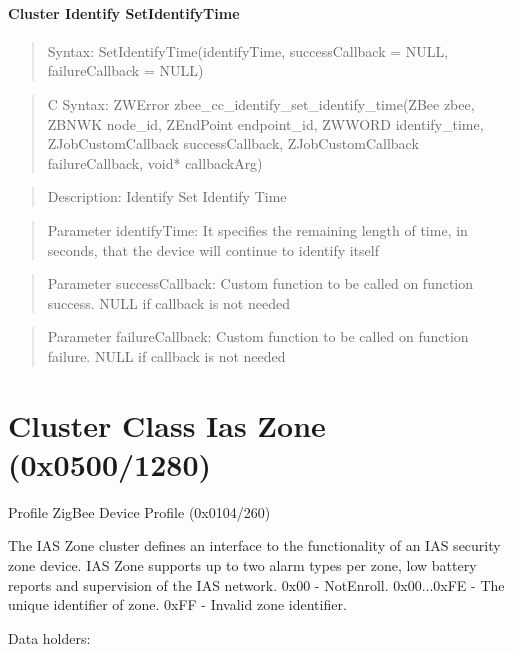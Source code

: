 \paragraph{Cluster Identify SetIdentifyTime}
\begin{quote}Syntax: SetIdentifyTime(identifyTime, successCallback = NULL, failureCallback = NULL)\end{quote}
\begin{quote}C Syntax: ZWError zbee\_cc\_identify\_set\_identify\_time(ZBee zbee, ZBNWK node\_id, ZEndPoint endpoint\_id, ZWWORD identify\_time, ZJobCustomCallback successCallback, ZJobCustomCallback failureCallback, void* callbackArg)\end{quote}
\begin{quote}Description: Identify Set Identify Time\end{quote}
\begin{quote}Parameter identifyTime: It specifies the remaining length of time, in seconds, that the device will continue to identify itself\end{quote}
\begin{quote}Parameter successCallback: Custom function to be called on function success. NULL if callback is not needed\end{quote}
\begin{quote}Parameter failureCallback: Custom function to be called on function failure. NULL if callback is not needed\end{quote}



\section{Cluster Class Ias Zone (0x0500/1280)}

Profile ZigBee Device Profile (0x0104/260)

The IAS Zone cluster defines an interface to the functionality of an IAS security zone device. IAS Zone supports up to two alarm types per zone, low battery reports and supervision of the IAS network. 			0x00 - NotEnroll. 			0x00...0xFE - The unique identifier of zone. 			0xFF - Invalid zone identifier.
\newline

\noindent
Data holders:

